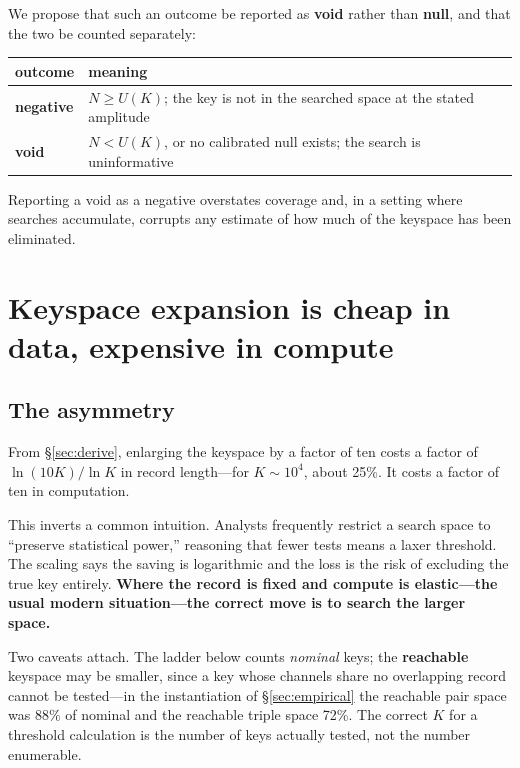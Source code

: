 We propose that such an outcome be reported as \textbf{void} rather than
\textbf{null}, and that the two be counted separately:

\begin{center}
\begin{tabular}{@{}ll@{}}
\toprule
outcome & meaning \\
\midrule
\textbf{negative} & $N \ge U(K)$; the key is not in the searched space at the stated amplitude \\
\textbf{void} & $N < U(K)$, or no calibrated null exists; the search is uninformative \\
\bottomrule
\end{tabular}
\end{center}

Reporting a void as a negative overstates coverage and, in a setting where
searches accumulate, corrupts any estimate of how much of the keyspace has been
eliminated.

\section{Keyspace expansion is cheap in data, expensive in compute}\label{sec:scaling}

\subsection{The asymmetry}

From \S\ref{sec:derive}, enlarging the keyspace by a factor of ten costs a factor
of $\ln(10K)/\ln K$ in record length---for $K\sim10^4$, about 25\%. It costs a
factor of ten in computation.

This inverts a common intuition. Analysts frequently restrict a search space to
``preserve statistical power,'' reasoning that fewer tests means a laxer
threshold. The scaling says the saving is logarithmic and the loss is the risk of
excluding the true key entirely. \textbf{Where the record is fixed and compute is
elastic---the usual modern situation---the correct move is to search the larger
space.}

Two caveats attach. The ladder below counts \emph{nominal} keys; the
\textbf{reachable} keyspace may be smaller, since a key whose channels share no
overlapping record cannot be tested---in the instantiation of
\S\ref{sec:empirical} the reachable pair space was 88\% of nominal and the
reachable triple space 72\%. The correct $K$ for a threshold calculation is the
number of keys actually tested, not the number enumerable.

